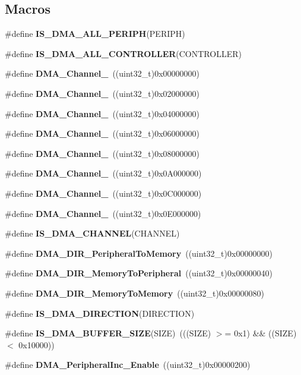\subsection*{Macros}
\begin{DoxyCompactItemize}
\item 
\#define \textbf{ I\+S\+\_\+\+D\+M\+A\+\_\+\+A\+L\+L\+\_\+\+P\+E\+R\+I\+PH}(P\+E\+R\+I\+PH)
\item 
\#define \textbf{ I\+S\+\_\+\+D\+M\+A\+\_\+\+A\+L\+L\+\_\+\+C\+O\+N\+T\+R\+O\+L\+L\+ER}(C\+O\+N\+T\+R\+O\+L\+L\+ER)
\item 
\#define \textbf{ D\+M\+A\+\_\+\+Channel\+\_}~((uint32\+\_\+t)0x00000000)
\item 
\#define \textbf{ D\+M\+A\+\_\+\+Channel\+\_}~((uint32\+\_\+t)0x02000000)
\item 
\#define \textbf{ D\+M\+A\+\_\+\+Channel\+\_}~((uint32\+\_\+t)0x04000000)
\item 
\#define \textbf{ D\+M\+A\+\_\+\+Channel\+\_}~((uint32\+\_\+t)0x06000000)
\item 
\#define \textbf{ D\+M\+A\+\_\+\+Channel\+\_}~((uint32\+\_\+t)0x08000000)
\item 
\#define \textbf{ D\+M\+A\+\_\+\+Channel\+\_}~((uint32\+\_\+t)0x0\+A000000)
\item 
\#define \textbf{ D\+M\+A\+\_\+\+Channel\+\_}~((uint32\+\_\+t)0x0\+C000000)
\item 
\#define \textbf{ D\+M\+A\+\_\+\+Channel\+\_}~((uint32\+\_\+t)0x0\+E000000)
\item 
\#define \textbf{ I\+S\+\_\+\+D\+M\+A\+\_\+\+C\+H\+A\+N\+N\+EL}(C\+H\+A\+N\+N\+EL)
\item 
\#define \textbf{ D\+M\+A\+\_\+\+D\+I\+R\+\_\+\+Peripheral\+To\+Memory}~((uint32\+\_\+t)0x00000000)
\item 
\#define \textbf{ D\+M\+A\+\_\+\+D\+I\+R\+\_\+\+Memory\+To\+Peripheral}~((uint32\+\_\+t)0x00000040)
\item 
\#define \textbf{ D\+M\+A\+\_\+\+D\+I\+R\+\_\+\+Memory\+To\+Memory}~((uint32\+\_\+t)0x00000080)
\item 
\#define \textbf{ I\+S\+\_\+\+D\+M\+A\+\_\+\+D\+I\+R\+E\+C\+T\+I\+ON}(D\+I\+R\+E\+C\+T\+I\+ON)
\item 
\#define \textbf{ I\+S\+\_\+\+D\+M\+A\+\_\+\+B\+U\+F\+F\+E\+R\+\_\+\+S\+I\+ZE}(S\+I\+ZE)~(((S\+I\+ZE) $>$= 0x1) \&\& ((\+S\+I\+Z\+E) $<$ 0x10000))
\item 
\#define \textbf{ D\+M\+A\+\_\+\+Peripheral\+Inc\+\_\+\+Enable}~((uint32\+\_\+t)0x00000200)
\item 

\end{DoxyCompactItemize}
